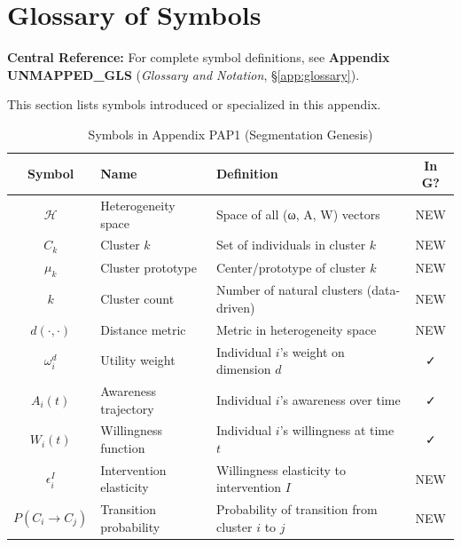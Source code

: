 \section{Glossary of Symbols}
\label{sec:ba-glossary}

\begin{tcolorbox}[colback=blue!5!white, colframe=blue!75!black]
\textbf{Central Reference:} For complete symbol definitions, see
\textbf{Appendix UNMAPPED_GLS} (\textit{Glossary and Notation}, \S\ref{app:glossary}).

This section lists symbols introduced or specialized in this appendix.
\end{tcolorbox}

\vspace{0.5em}

\begin{table}[htbp]
\centering
\caption{Symbols in Appendix PAP1 (Segmentation Genesis)}
\label{tab:ba-symbols}
\renewcommand{\arraystretch}{1.4}
\begin{tabular}{@{}clp{5cm}c@{}}
\toprule
\textbf{Symbol} & \textbf{Name} & \textbf{Definition} & \textbf{In G?} \\
\midrule
$\mathcal{H}$ & Heterogeneity space & Space of all (ω, A, W) vectors & NEW \\
$C_k$ & Cluster $k$ & Set of individuals in cluster $k$ & NEW \\
$\mu_k$ & Cluster prototype & Center/prototype of cluster $k$ & NEW \\
$k$ & Cluster count & Number of natural clusters (data-driven) & NEW \\
$d(\cdot, \cdot)$ & Distance metric & Metric in heterogeneity space & NEW \\
$\omega_i^d$ & Utility weight & Individual $i$'s weight on dimension $d$ & ✓ \\
$A_i(t)$ & Awareness trajectory & Individual $i$'s awareness over time & ✓ \\
$W_i(t)$ & Willingness function & Individual $i$'s willingness at time $t$ & ✓ \\
$\epsilon_i^I$ & Intervention elasticity & Willingness elasticity to intervention $I$ & NEW \\
$P(C_i \to C_j)$ & Transition probability & Probability of transition from cluster $i$ to $j$ & NEW \\
\bottomrule
\end{tabular}
\end{table}

